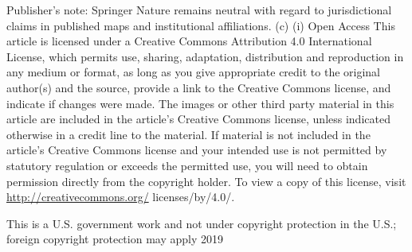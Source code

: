 \documentclass[10pt]{article}
\begin{document}
Publisher's note: Springer Nature remains neutral with regard to jurisdictional claims in published maps and institutional affiliations. (c) (i) Open Access This article is licensed under a Creative Commons Attribution 4.0 International License, which permits use, sharing, adaptation, distribution and reproduction in any medium or format, as long as you give appropriate credit to the original author(s) and the source, provide a link to the Creative Commons license, and indicate if changes were made. The images or other third party material in this article are included in the article's Creative Commons license, unless indicated otherwise in a credit line to the material. If material is not included in the article's Creative Commons license and your intended use is not permitted by statutory regulation or exceeds the permitted use, you will need to obtain permission directly from the copyright holder. To view a copy of this license, visit \href{http://creativecommons.org/}{http://creativecommons.org/} licenses/by/4.0/.

This is a U.S. government work and not under copyright protection in the U.S.; foreign copyright protection may apply 2019
\end{document}
